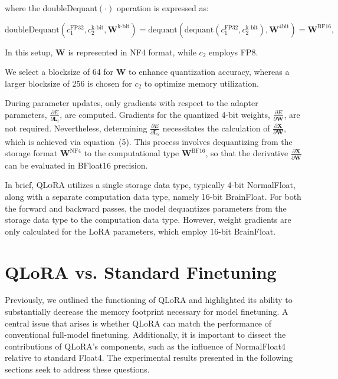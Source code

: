 where the doubleDequant$(\cdot)$ operation is expressed as:

\begin{equation}
    \text{doubleDequant}(c_1^{\text{FP32}}, c_2^{\text{k-bit}}, \mathbf{W}^{\text{k-bit}}) = \text{dequant}(\text{dequant}(c_1^{\text{FP32}}, c_2^{\text{k-bit}}), \mathbf{W}^{\text{4bit}}) = \mathbf{W}^{\text{BF16}},
\end{equation}

In this setup, $\mathbf{W}$ is represented in NF4 format, while $c_2$ employs FP8.

We select a blocksize of 64 for $\mathbf{W}$ to enhance quantization accuracy, whereas a larger blocksize of 256 is chosen for $c_2$ to optimize memory utilization.

During parameter updates, only gradients with respect to the adapter parameters, $\frac{\partial E}{\partial \mathbf{L}_i}$, are computed. Gradients for the quantized 4-bit weights, $\frac{\partial E}{\partial \mathbf{W}}$, are not required. Nevertheless, determining $\frac{\partial E}{\partial \mathbf{L}_i}$ necessitates the calculation of $\frac{\partial \mathbf{X}}{\partial \mathbf{W}}$, which is achieved via equation~(5). This process involves dequantizing from the storage format $\mathbf{W}^{\text{NF4}}$ to the computational type $\mathbf{W}^{\text{BF16}}$, so that the derivative $\frac{\partial \mathbf{X}}{\partial \mathbf{W}}$ can be evaluated in BFloat16 precision.

In brief, \textsc{QLoRA} utilizes a single storage data type, typically 4-bit NormalFloat, along with a separate computation data type, namely 16-bit BrainFloat. For both the forward and backward passes, the model dequantizes parameters from the storage data type to the computation data type. However, weight gradients are only calculated for the LoRA parameters, which employ 16-bit BrainFloat.

\section{QLoRA vs. Standard Finetuning}
\label{sec:comp_to_std}

Previously, we outlined the functioning of QLoRA and highlighted its ability to substantially decrease the memory footprint necessary for model finetuning. A central issue that arises is whether QLoRA can match the performance of conventional full-model finetuning. Additionally, it is important to dissect the contributions of QLoRA’s components, such as the influence of NormalFloat4 relative to standard Float4. The experimental results presented in the following sections seek to address these questions.

